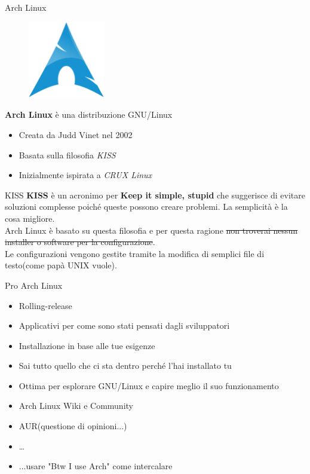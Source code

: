 \begin{frame}{Arch Linux}
    \begin{figure}[h]
        \includegraphics[width=0.3\textwidth]{images/Archlinux-icon-crystal-64.png}
    \end{figure}
    \textbf{Arch Linux} è una distribuzione GNU/Linux\\

    \begin{itemize}
        \item Creata da Judd Vinet nel 2002
        \item Basata sulla filosofia \textit{KISS}
        \item Inizialmente ispirata a \textit{CRUX Linux}
    \end{itemize}
\end{frame}


\begin{frame}{KISS}
    \textbf{KISS} è un acronimo per \textbf{Keep it simple, stupid} che suggerisce di evitare soluzioni  complesse
    poiché queste possono creare problemi. La semplicità è la cosa migliore.\\

    Arch Linux è basato su questa filosofia e per questa ragione \sout{non troverai nessun installer o software per la configurazione}.\\
    Le configurazioni vengono gestite tramite la modifica di semplici file di testo(come papà UNIX vuole).
\end{frame}


\begin{frame}{Pro Arch Linux}
    \begin{itemize}
        \item Rolling-release
        \item Applicativi per come sono stati pensati dagli sviluppatori
        \item Installazione in base alle tue esigenze
        \item Sai tutto quello che ci sta dentro perché l'hai installato tu
        \item Ottima per esplorare GNU/Linux e capire meglio il suo funzionamento
        \item Arch Linux Wiki e Community
        \item AUR(questione di opinioni...)
        \item \dots
        \item ...usare "Btw I use Arch" come intercalare
    \end{itemize}

\end{frame}

